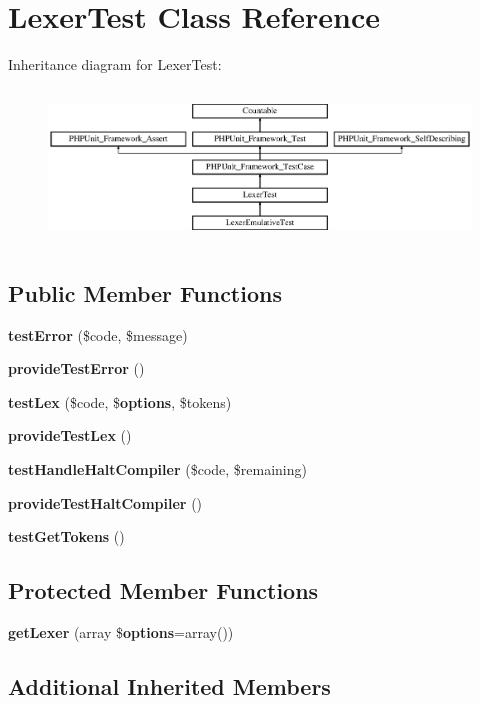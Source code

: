 \section{Lexer\+Test Class Reference}
\label{class_php_parser_1_1_lexer_test}
Inheritance diagram for Lexer\+Test\+:\begin{figure}[H]
\begin{center}
\leavevmode
\includegraphics[height=4.129793cm]{class_php_parser_1_1_lexer_test}
\end{center}
\end{figure}
\subsection*{Public Member Functions}
\begin{DoxyCompactItemize}
\item 
{\bf test\+Error} (\$code, \$message)
\item 
{\bf provide\+Test\+Error} ()
\item 
{\bf test\+Lex} (\$code, \${\bf options}, \$tokens)
\item 
{\bf provide\+Test\+Lex} ()
\item 
{\bf test\+Handle\+Halt\+Compiler} (\$code, \$remaining)
\item 
{\bf provide\+Test\+Halt\+Compiler} ()
\item 
{\bf test\+Get\+Tokens} ()
\end{DoxyCompactItemize}
\subsection*{Protected Member Functions}
\begin{DoxyCompactItemize}
\item 
{\bf get\+Lexer} (array \${\bf options}=array())
\end{DoxyCompactItemize}
\subsection*{Additional Inherited Members}


